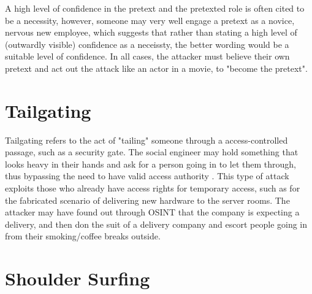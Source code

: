 A high level of confidence in the pretext and the pretexted role is often cited to be a necessity, however, someone may very well engage a pretext as a novice, nervous new employee, which suggests that rather than stating a high level of (outwardly visible) confidence as a neceissty, the better wording would be a suitable level of confidence. In all cases, the attacker must believe their own pretext and act out the attack like an actor in a movie, to "become the pretext".


\section{Tailgating}

Tailgating refers to the act of "tailing" someone through a access-controlled passage, such as a security gate. The social engineer may hold something that looks heavy in their hands and ask for a person going in to let them through, thus bypassing the need to have valid access authority \citep{conteh_cybersecurityrisks_2016}. This type of attack exploits those who already have access rights for temporary access, such as for the fabricated scenario of delivering new hardware to the server rooms. The attacker may have found out through OSINT that the company is expecting a delivery, and then don the suit of a delivery company and escort people going in from their smoking/coffee breaks outside.




\section{Shoulder Surfing}

